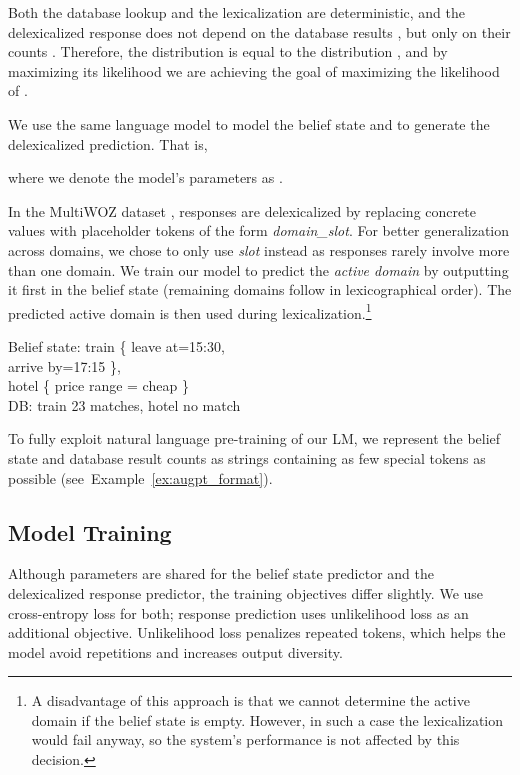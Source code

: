 \documentclass[11pt]{article}
\newcommand{\exampleref}[1]{Example~\ref{#1}}
\newcommand{\augpt}[0]{AuGPT\xspace}
\begin{document}
Both the database lookup and the lexicalization are deterministic, and the delexicalized response  does not depend on the database results , but only on their counts . Therefore, the distribution  is equal to the distribution , and by maximizing its likelihood we are achieving the goal of maximizing the likelihood of .

We use the same language model  to model the belief state and to generate the delexicalized prediction. That is,

where we denote the model's parameters as .

In the MultiWOZ dataset \cite[see Section~\ref{sec:experiments}]{budzianowski2018,eric2019}, responses are delexicalized by replacing concrete values with placeholder tokens of the form \textit{domain\_slot}. For better generalization across domains, we chose to only use \textit{slot} instead
as responses rarely involve more than one domain.
We train our model to predict the \textit{active domain} by outputting it first in the belief state (remaining domains follow in lexicographical order).
The predicted active domain is then used during lexicalization.\footnote{A disadvantage of this approach is that we cannot determine the active domain if the belief state is empty. However, in such a case the lexicalization would fail anyway, so the system's performance is not affected by this decision.}

\begin{example}
\begin{mdframed}[style=ExampleFrame]
Belief state: train \{ leave at=15:30, \\ 
\-\hspace{10pt}arrive by=17:15 \}, \\
\-\hspace{10pt}hotel \{ price range = cheap \} \\
DB: train 23 matches, hotel no match
\end{mdframed}
\caption{String format for \augpt's belief state and database result count\label{ex:augpt_format}.}
\end{example}

To fully exploit natural language pre-training of our LM, we represent the belief state and database result counts as strings containing as few special tokens as possible (see~\exampleref{ex:augpt_format}).


\subsection{Model Training}
\label{sec:model-traning}
Although parameters are shared for the belief state predictor and the delexicalized response predictor, the training objectives differ slightly. We use cross-entropy loss for both; response prediction uses  unlikelihood loss \cite{welleck2019,li_dont_2020} as an additional objective. Unlikelihood loss penalizes repeated tokens, which helps the model avoid repetitions and increases output diversity.
\end{document}
